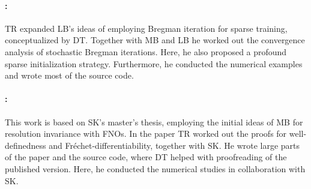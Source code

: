 \paragraph{\cite{bungert2022bregman}:} TR expanded LB's ideas of employing Bregman iteration for sparse training, conceptualized by DT. Together with MB and LB he worked out the convergence analysis of stochastic Bregman iterations. Here, he also proposed a profound sparse initialization strategy. Furthermore, he conducted the numerical examples and wrote most of the source code.

\paragraph{\cite{kabri2023resolution}:} This work is based on SK's master's thesis, employing the initial ideas of MB for resolution invariance with FNOs. In the paper TR worked out the proofs for well-definedness and Fréchet-differentiability, together with SK. He wrote large parts of the paper and the source code, where DT helped with proofreading of the published version. Here, he conducted the numerical studies in collaboration with SK.


